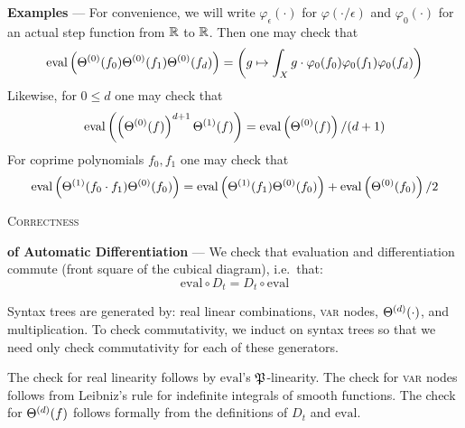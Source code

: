     \textbf{Examples} ---
    For convenience, we will write $\varphi_\epsilon(\cdot)$ for
    $\varphi(\cdot/\epsilon)$ and $\varphi_0(\cdot)$ for an actual step
    function from ${\mathbb R}$ to ${\mathbb R}$.  Then one may check that 
    $$
        \text{eval}\left(\Theta^{(0)}(f_0)\Theta^{(0)}(f_1)\Theta^{(0)}(f_d)\right)
        =
        \left(
            g \mapsto
            \int_X g \cdot \varphi_0(f_0)\varphi_0(f_1)\varphi_0(f_d)
        \right)
    $$
    Likewise, for $0\leq d$ one may check that
    $$
        \text{eval}\left(\left(\Theta^{(0)}(f)\right)^{d+1}\Theta^{(1)}(f)\right) 
        =
        \text{eval}\left(\Theta^{(0)}(f)\right) / (d+1)
    $$
    For coprime polynomials $f_0, f_1$ one may check that
    $$
        \text{eval}\left(\Theta^{(1)}(f_0\cdot f_1)\Theta^{(0)}(f_0)\right) 
        =
        \text{eval}\left(\Theta^{(1)}(f_1)\Theta^{(0)}(f_0)\right) 
        +
        \text{eval}\left(\Theta^{(0)}(f_0)\right)/2 
    $$

\begin{center}\large\textsc{Correctness}\end{center}

    \textbf{of Automatic Differentiation} ---
    We check that evaluation and differentiation commute (front square of
    the cubical diagram), i.e.\ that:
    $$
        \text{eval}\circ D_t 
        =
        D_t\circ \text{eval} 
    $$

    Syntax trees are generated by: real linear combinations, \textsc{var}
    nodes, $\Theta^{(d)}(\cdot)$, and multiplication.  To check commutativity, we
    induct on syntax trees so that we need only check commutativity for each of
    these generators.

    The check for real linearity follows by
    $\text{eval}$'s $\frak P$-linearity.  The check for \textsc{var}
    nodes follows from Leibniz's rule for indefinite integrals of smooth
    functions.  The check for $\Theta^{(d)}(f)$ follows formally from the
    definitions of $D_t$ and $\text{eval}$.  

